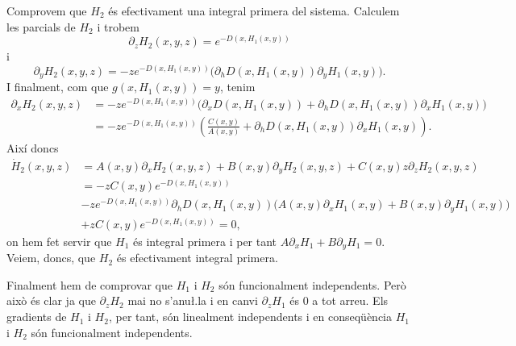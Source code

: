 \documentclass[12pt]{article}
\numberwithin{table}{section}
\numberwithin{equation}{section}
\numberwithin{figure}{section}
\begin{document}
Comprovem que \( H_2 \) és efectivament una integral primera del sistema. Calculem les parcials de \( H_2 \) i trobem
\begin{equation*}
	\partial_z H_2(x,y,z) = e^{-D(x,H_1(x,y))}
\end{equation*}
i
\begin{equation*}
	\partial_y H_2(x,y,z) = -ze^{-D(x,H_1(x,y))} \big(\partial_h D(x, H_1(x,y)) \partial_y H_1(x,y)\big).
\end{equation*}
I finalment, com que \( g(x, H_1(x,y)) = y \), tenim
\begin{align*}
	\partial_x H_2(x,y,z) & = -ze^{-D(x,H_1(x,y))} \big(\partial_x D(x,H_1(x,y)) + \partial_h D(x, H_1(x,y)) \partial_x H_1(x,y)\big) \\
												& = -ze^{-D(x,H_1(x,y))} \left(\frac{C(x,y)}{A(x,y)} + \partial_h D(x, H_1(x,y)) \partial_x H_1(x,y)\right).
\end{align*}
Així doncs
\begin{align*}
	\dot{H}_2(x,y,z) & = A(x,y)\partial_x H_2(x,y,z) + B(x,y)\partial_y H_2(x,y,z) + C(x,y)z\partial_z H_2(x,y,z) \\
									 & = -zC(x,y) e^{-D(x,H_1(x,y))} \\
									 & -z e^{-D(x,H_1(x,y))} \partial_h D(x, H_1(x,y)) \big( A(x,y) \partial_x H_1(x,y) + B(x,y) \partial_y H_1(x,y) \big) \\ 
									 & + zC(x,y) e^{-D(x,H_1(x,y))} = 0,
\end{align*}
on hem fet servir que \( H_1 \) és integral primera i per tant \( A\partial_xH_1 + B\partial_yH_1 = 0 \). Veiem, doncs, que \( H_2 \) és efectivament integral primera. 

Finalment hem de comprovar que \( H_1 \) i \( H_2 \) són funcionalment independents. Però això és clar ja que \( \partial_z H_2 \) mai no s'anu\l.la i en canvi \( \partial_z H_1 \) és 0 a tot arreu. Els gradients de \( H_1 \) i \( H_2 \), per tant, són linealment independents i en conseqüència \( H_1 \) i \( H_2 \) són funcionalment independents. 
\end{document}

